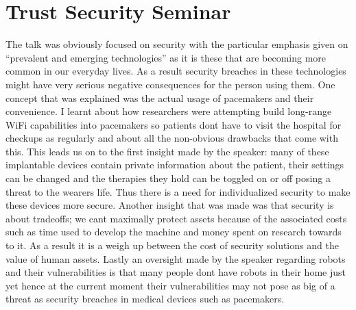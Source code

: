\documentclass[12pt, oneside]{report}
\begin{document}
\section{Trust Security Seminar}
The talk was obviously focused on security with the particular emphasis given on ``prevalent and emerging technologies'' as it is these that are becoming more common in our everyday lives. As a result security breaches in these technologies might have very serious negative consequences for the person using them. One concept that was explained was the actual usage of pacemakers and their convenience. I learnt about how researchers were attempting build long-range WiFi capabilities into pacemakers so patients dont have to visit the hospital for checkups as regularly and about all the non-obvious drawbacks that come with this. This leads us on to the first insight made by the speaker: many of these implantable devices contain private information about the patient, their settings can be changed and the therapies they hold can be toggled on or off posing a threat to the wearers life. Thus there is a need for individualized security to make these devices more secure. Another insight that was made was that security is about tradeoffs; we cant maximally protect assets because of the associated costs such as time used to develop the machine and money spent on research towards to it. As a result it is a weigh up between the cost of security solutions and the value of human assets. Lastly an oversight made by the speaker regarding robots and their vulnerabilities is that many people dont have robots in their home just yet hence at the current moment their vulnerabilities may not pose as big of a threat as security breaches in medical devices such as pacemakers. 
\end{document}
